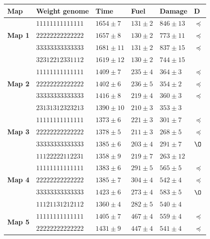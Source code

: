 \documentclass[journal]{IEEEtran}
\begin{document}
\begin{table}[!t]
\begin{center}
\begin{tabular}{|p{0.8cm}|p{1.95cm}|m{1.13cm}|m{1.13cm}|m{1.13cm}|m{0.1cm}|}
\hline
\textbf{Map}  & \textbf{Weight genome} & \textbf{Time} &  \textbf{Fuel} & \textbf{Damage} & \textbf{D}\\ 
\hline
 \multirow{3}{*}{\textbf{Map 1}} & $11111111111111$ & $1654 \pm 7$ & $131 \pm 2$& $846 \pm 13$ & $\preceq$ \\
 & $22222222222222$ & $1657 \pm 8$ & $130 \pm 2$ & $773 \pm 11$ & $\preceq$ \\
 & $33333333333333$ & $1681 \pm 11$ & $131 \pm 2$ & $837 \pm 15$ & $\preceq$ \\
 & $32312212331112$ & $1619 \pm 12$ & $130 \pm 2$ & $744 \pm 15$ & \\
\hline
 \multirow{3}{*}{\textbf{Map 2}} & $11111111111111$ & $1409 \pm 7$ & $235 \pm 4$& $364 \pm 3$ & $\preceq$ \\
 & $22222222222222$ & $1402 \pm 6$ & $236 \pm 5$ & $354 \pm 2$ & $\preceq$ \\
 & $33333333333333$ & $1416 \pm 8$ & $219 \pm 4$ & $360 \pm 3$ & $\preceq$ \\
 & $23131312323213$ & $1390 \pm 10$ & $210 \pm 3$ & $353 \pm 3$ & \\
\hline
 \multirow{3}{*}{\textbf{Map 3}} & $11111111111111$ & $1373 \pm 6$ & $221 \pm 3$& $301 \pm 7$ & $\preceq$ \\
 & $22222222222222$ & $1378 \pm 5$ & $211 \pm 3$ & $268 \pm 5$ & $\preceq$ \\
 & $33333333333333$ & $1385 \pm 6$ & $203 \pm 4$ & $291 \pm 7$ & $\O$ \\
 & $11122222112231$ & $1358 \pm 9$ & $219 \pm 7$ & $263 \pm 12$ & \\
\hline
 \multirow{3}{*}{\textbf{Map 4}} & $11111111111111$ & $1383 \pm 6$ & $291 \pm 5$& $565 \pm 5$ & $\preceq$ \\
 & $22222222222222$ & $1385 \pm 7$ & $304 \pm 4$ & $542 \pm 4$ & $\preceq$ \\
 & $33333333333333$ & $1423 \pm 6$ & $273 \pm 4$ & $583 \pm 5$ &  $\O$ \\
 & $11121131212112$ & $1360 \pm 4$ & $282 \pm 5$ & $540 \pm 4$ & \\
\hline
 \multirow{3}{*}{\textbf{Map 5}} & $11111111111111$ & $1405 \pm 7$ & $467 \pm 4$& $559 \pm 4$ & $\preceq$ \\
 & $22222222222222$ & $1431 \pm 9$ & $447 \pm 4$ &  $541 \pm 4$ & $\preceq$ \\

\end{tabular}
\end{center}
\end{table}
\end{document}

